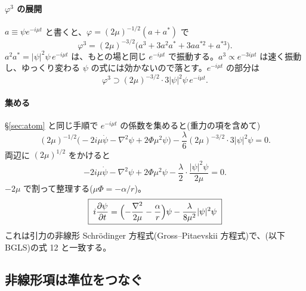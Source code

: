 \paragraph{$\varphi^3$ の展開}
$a\equiv\psi e^{-i\mu t}$ と書くと、$\varphi=(2\mu)^{-1/2}(a+a^*)$ で
\begin{equation}
\varphi^3=(2\mu)^{-3/2}\bigl(a^3+3a^2a^*+3aa^{*2}+a^{*3}\bigr).
\end{equation}
$a^2a^*=|\psi|^2\psi\,e^{-i\mu t}$ は、もとの場と同じ $e^{-i\mu t}$ で振動する。$a^3\propto e^{-3i\mu t}$ は速く振動し、ゆっくり変わる $\psi$ の式には効かないので落とす。$e^{-i\mu t}$ の部分は
\begin{equation}
\varphi^3\supset(2\mu)^{-3/2}\cdot3|\psi|^2\psi\,e^{-i\mu t}.
\end{equation}

\paragraph{集める}
\S\ref{sec:atom} と同じ手順で $e^{-i\mu t}$ の係数を集めると(重力の項を含めて)
\begin{equation}
(2\mu)^{-1/2}\bigl(-2i\mu\dot\psi-\nabla^2\psi+2\Phi\mu^2\psi\bigr)-\frac{\lambda}{6}(2\mu)^{-3/2}\cdot3|\psi|^2\psi=0.
\end{equation}
両辺に $(2\mu)^{1/2}$ をかけると
\begin{equation}
-2i\mu\dot\psi-\nabla^2\psi+2\Phi\mu^2\psi-\frac{\lambda}{2}\cdot\frac{|\psi|^2\psi}{2\mu}=0.
\end{equation}
$-2\mu$ で割って整理する($\mu\Phi=-\alpha/r$)。
\begin{equation}
\boxed{\;i\frac{\partial\psi}{\partial t}=\Bigl(-\frac{\nabla^2}{2\mu}-\frac{\alpha}{r}\Bigr)\psi-\frac{\lambda}{8\mu^2}|\psi|^2\psi\;}
\label{eq:GP}
\end{equation}
これは引力の非線形 Schr\"odinger 方程式(Gross--Pitaevskii 方程式)で、(以下 BGLS)の式 12 と一致する。

\subsection{非線形項は準位をつなぐ}

